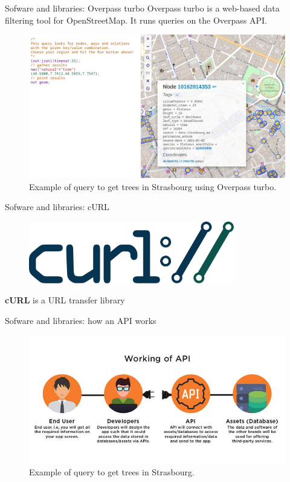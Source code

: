 \documentclass[12pt]{beamer}
\begin{document}
\begin{frame}{Sofware and libraries: Overpass turbo}
  Overpass turbo is a web-based data filtering tool for OpenStreetMap. 
  It runs queries on the Overpass API.
  
    \begin{figure}[H]
      \centering
      \includegraphics[width=1\textwidth]{images/overpass_turbo.png}
      \caption{Example of query to get trees in Strasbourg using Overpass turbo.}
    \end{figure}
  \end{frame}

\begin{frame}{Sofware and libraries: cURL}
  \begin{figure}[H]
      \centering
      \includegraphics[width=0.8\textwidth]{images/Curl-logo.svg.png}
  \end{figure}
  \begin{center}
  \textbf{cURL} is a URL transfer library
  \end{center}
\end{frame}

\begin{frame}{Sofware and libraries: how an API works}
  \begin{figure}[H]
    \centering
    \includegraphics[width=1\textwidth]{images/how-api-works.jpg}
    \caption{Example of query to get trees in Strasbourg.}
  \end{figure}
\end{frame}
\end{document}
